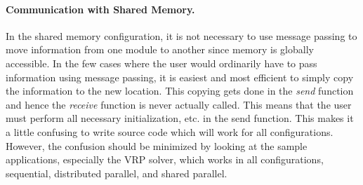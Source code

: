 \paragraph{Communication with Shared Memory.}
\label{shared}
In the shared memory configuration, it is not necessary to use
message passing to move information from one module to another since
memory is globally accessible. In the few cases where the user would
ordinarily have to pass information using message passing, it is
easiest and most efficient to simply copy the information to the new
location. This copying gets done in the {\em send} function and hence
the {\em receive} function is never actually called. This means that
the user must perform all necessary initialization, etc. in the send
function. This makes it a little confusing to write source code which
will work for all configurations. However, the confusion should be
minimized by looking at the sample applications, especially the VRP solver,
which works in all configurations, sequential, distributed parallel, and
shared parallel. 

